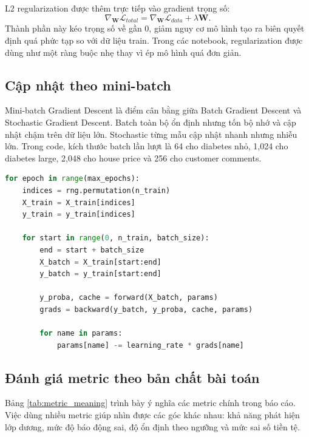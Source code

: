 \documentclass[12pt,a4paper]{report}
\begin{document}
L2 regularization được thêm trực tiếp vào gradient trọng số:
\begin{equation}
    \nabla_{\mathbf{W}}\mathcal{L}_{total}
    =
    \nabla_{\mathbf{W}}\mathcal{L}_{data}
    +
    \lambda \mathbf{W}.
\end{equation}
Thành phần này kéo trọng số về gần 0, giảm nguy cơ mô hình tạo ra biên quyết định quá phức tạp so với dữ liệu train.
Trong các notebook, regularization được dùng như một ràng buộc nhẹ thay vì ép mô hình quá đơn giản.

\subsection{Cập nhật theo mini-batch}
Mini-batch Gradient Descent là điểm cân bằng giữa Batch Gradient Descent và Stochastic Gradient Descent.
Batch toàn bộ ổn định nhưng tốn bộ nhớ và cập nhật chậm trên dữ liệu lớn.
Stochastic từng mẫu cập nhật nhanh nhưng nhiễu lớn.
Trong code, kích thước batch lần lượt là 64 cho diabetes nhỏ, 1,024 cho diabetes large, 2,048 cho house price và 256 cho customer comments.

\begin{lstlisting}[language=Python, caption={Vòng lặp mini-batch gradient descent}, label={lst:minibatch}]
for epoch in range(max_epochs):
    indices = rng.permutation(n_train)
    X_train = X_train[indices]
    y_train = y_train[indices]

    for start in range(0, n_train, batch_size):
        end = start + batch_size
        X_batch = X_train[start:end]
        y_batch = y_train[start:end]

        y_proba, cache = forward(X_batch, params)
        grads = backward(y_batch, y_proba, cache, params)

        for name in params:
            params[name] -= learning_rate * grads[name]
\end{lstlisting}

\subsection{Đánh giá metric theo bản chất bài toán}
Bảng \ref{tab:metric_meaning} trình bày ý nghĩa các metric chính trong báo cáo.
Việc dùng nhiều metric giúp nhìn được các góc khác nhau: khả năng phát hiện lớp dương, mức độ báo động sai, độ ổn định theo ngưỡng và mức sai số tiền tệ.
\end{document}
